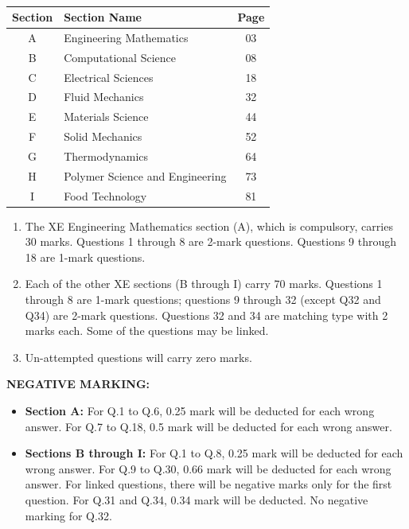 \documentclass[12pt]{article}
\begin{document}
\begin{center}
\begin{table}[H]     \centering     \caption{}     \label{}     \begin{tabular}{|c|l|c|}
    \hline
    \textbf{Section} & \textbf{Section Name} & \textbf{Page} \\
    \hline
    A & Engineering Mathematics & 03 \\
    \hline
    B & Computational Science & 08 \\
     \hline
    C & Electrical Sciences & 18\\
     \hline
    D & Fluid Mechanics & 32 \\
     \hline
    E & Materials Science & 44 \\
     \hline
    F & Solid Mechanics & 52 \\
     \hline
    G & Thermodynamics & 64 \\
     \hline
    H & Polymer Science and Engineering & 73 \\
     \hline
    I & Food Technology & 81 \\
    \hline
\end{tabular} \end{table}
\end{center}

\begin{enumerate}[start=7,label=\arabic*.]
    \item The XE Engineering Mathematics section (A), which is compulsory, carries 30 marks. Questions 1 through 8 are 2-mark questions. Questions 9 through 18 are 1-mark questions.

    \item Each of the other XE sections (B through I) carry 70 marks. Questions 1 through 8 are 1-mark questions; questions 9 through 32 (except Q32 and Q34) are 2-mark questions. Questions 32 and 34 are matching type with 2 marks each. Some of the questions may be linked.

    \item Un-attempted questions will carry zero marks.
\end{enumerate}

\textbf{NEGATIVE MARKING:}
\begin{itemize}
    \item \textbf{Section A:} For Q.1 to Q.6, 0.25 mark will be deducted for each wrong answer. For Q.7 to Q.18, 0.5 mark will be deducted for each wrong answer.

    \item \textbf{Sections B through I:} For Q.1 to Q.8, 0.25 mark will be deducted for each wrong answer. For Q.9 to Q.30, 0.66 mark will be deducted for each wrong answer. For linked questions, there will be negative marks only for the first question. For Q.31 and Q.34, 0.34 mark will be deducted. No negative marking for Q.32.
\end{itemize}
\end{document}
